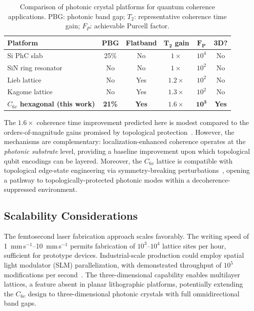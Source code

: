 \documentclass[10pt,letterpaper]{article}
\begin{document}
\begin{table}[h]
\centering
\caption{Comparison of photonic crystal platforms for quantum coherence applications. PBG: photonic band gap; $T_2$: representative coherence time gain; $F_P$: achievable Purcell factor.}
\label{tab:comparison}
\begin{tabular}{lccccc}
\toprule
\textbf{Platform} & \textbf{PBG} & \textbf{Flatband} & $\boldsymbol{T_2}$ \textbf{gain} & $\boldsymbol{F_P}$ & \textbf{3D?} \\
\midrule
Si PhC slab~\cite{Akahane2003} & 25\% & No & $1\times$ & $10^4$ & No \\
SiN ring resonator~\cite{Kosaka1998} & No & No & $1\times$ & $10^2$ & No \\
Lieb lattice~\cite{Lustig2019} & No & Yes & $1.2\times$ & $10^2$ & No \\
Kagome lattice~\cite{Pertsch2002} & No & Yes & $1.3\times$ & $10^2$ & No \\
\textbf{$C_{6v}$ hexagonal (this work)} & \textbf{21\%} & \textbf{Yes} & $\boldsymbol{1.6\times}$ & $\boldsymbol{10^3}$ & \textbf{Yes} \\
\bottomrule
\end{tabular}
\end{table}

The $1.6\times$ coherence time improvement predicted here is modest compared to the orders-of-magnitude gains promised by topological protection~\cite{Kitaev2003}. However, the mechanisms are complementary: localization-enhanced coherence operates at the \textit{photonic substrate} level, providing a baseline improvement upon which topological qubit encodings can be layered. Moreover, the $C_{6v}$ lattice is compatible with topological edge-state engineering via symmetry-breaking perturbations~\cite{Ozawa2019,Wu2017}, opening a pathway to topologically-protected photonic modes within a decoherence-suppressed environment.

\subsection{Scalability Considerations}

The femtosecond laser fabrication approach scales favorably. The writing speed of 1~mm\,s$^{-1}$--10~mm\,s$^{-1}$ permits fabrication of $10^3$--$10^4$ lattice sites per hour, sufficient for prototype devices. Industrial-scale production could employ spatial light modulator (SLM) parallelization, with demonstrated throughput of $10^5$ modifications per second~\cite{Davis1996}. The three-dimensional capability enables multilayer lattices, a feature absent in planar lithographic platforms, potentially extending the $C_{6v}$ design to three-dimensional photonic crystals with full omnidirectional band gaps.
\end{document}
